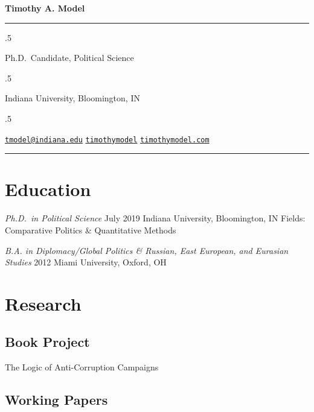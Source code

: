 \documentclass[11pt,]{article}
\begin{document}
\centerline{\huge \bf Timothy A. Model}

\vspace{2 mm}

\hrule

\vspace{2 mm}

\moveleft.5\hoffset\centerline{Ph.D.~Candidate, Political Science}
\moveleft.5\hoffset\centerline{Indiana University, Bloomington, IN}
\moveleft.5\hoffset\centerline{ \faEnvelopeO \hspace{1 mm} \href{mailto:}{\tt \href{mailto:tmodel@indiana.edu}{\nolinkurl{tmodel@indiana.edu}}} \hspace{1 mm}  \faGithub \hspace{1 mm} \href{http://github.com/timothymodel}{\tt timothymodel} \hspace{1 mm}    \faGlobe \hspace{1 mm} \href{http://timothymodel.com}{\tt timothymodel.com}   }

\vspace{2 mm}

\hrule


\hypertarget{education}{%
\section{Education}\label{education}}

\emph{Ph.D.~in Political Science} \hfill July 2019 \newline Indiana
University, Bloomington, IN \hfill \newline Fields: Comparative Politics
\& Quantitative Methods

\emph{B.A. in Diplomacy/Global Politics \& Russian, East European, and
Eurasian Studies} \hfill 2012 \newline Miami University, Oxford, OH

\hypertarget{research}{%
\section{Research}\label{research}}

\hypertarget{book-project}{%
\subsection{Book Project}\label{book-project}}

The Logic of Anti-Corruption Campaigns

\hypertarget{working-papers}{%
\subsection{Working Papers}\label{working-papers}}
\end{document}
